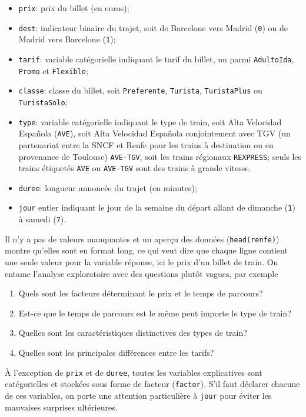 \documentclass[
  11pt,
  letterpaper,
]{article}
\providecommand{\tightlist}{%
  \setlength{\itemsep}{0pt}\setlength{\parskip}{0pt}}
\theoremstyle{definition}
\theoremstyle{definition}
\theoremstyle{definition}
\theoremstyle{remark}
\begin{document}
\begin{itemize}
\tightlist
\item
  \texttt{prix}: prix du billet (en euros);
\item
  \texttt{dest}: indicateur binaire du trajet, soit de Barcelone vers Madrid (\texttt{0}) ou de Madrid vers Barcelone (\texttt{1});
\item
  \texttt{tarif}: variable catégorielle indiquant le tarif du billet, un parmi \texttt{AdultoIda}, \texttt{Promo} et \texttt{Flexible};
\item
  \texttt{classe}: classe du billet, soit \texttt{Preferente}, \texttt{Turista}, \texttt{TuristaPlus} ou \texttt{TuristaSolo};
\item
  \texttt{type}: variable catégorielle indiquant le type de train, soit Alta Velocidad Española (\texttt{AVE}), soit Alta Velocidad Española conjointement avec TGV (un partenariat entre la SNCF et Renfe pour les trains à destination ou en provenance de Toulouse) \texttt{AVE-TGV}, soit les trains régionaux \texttt{REXPRESS}; seuls les trains étiquetés \texttt{AVE} ou \texttt{AVE-TGV} sont des trains à grande vitesse.
\item
  \texttt{duree}: longueur annoncée du trajet (en minutes);
\item
  \texttt{jour} entier indiquant le jour de la semaine du départ allant de dimanche (\texttt{1}) à samedi (\texttt{7}).
\end{itemize}

Il n'y a pas de valeurs manquantes et un aperçu des données (\texttt{head(renfe)}) montre qu'elles sont en format long, ce qui veut dire que chaque ligne contient une seule valeur pour la variable réponse, ici le prix d'un billet de train. On entame l'analyse exploratoire avec des questions plutôt vagues, par exemple

\begin{enumerate}
\def\labelenumi{\arabic{enumi}.}
\tightlist
\item
  Quels sont les facteurs déterminant le prix et le temps de parcours?
\item
  Est-ce que le temps de parcours est le même peut importe le type de train?
\item
  Quelles sont les caractéristiques distinctives des types de train?
\item
  Quelles sont les principales différences entre les tarifs?
\end{enumerate}

À l'exception de \texttt{prix} et de \texttt{duree}, toutes les variables explicatives sont catégorielles et stockées sous forme de facteur (\texttt{factor}). S'il faut déclarer chacune de ces variables, on porte une attention particulière à \texttt{jour} pour éviter les mauvaises surprises ultérieures.
\end{document}
